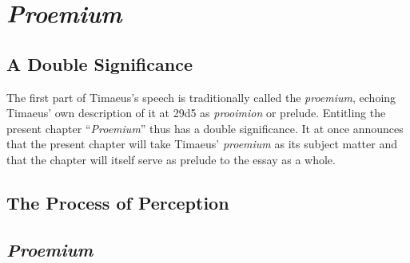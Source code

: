 
\chapter{\emph{Proemium}} %
\label{cha:proemium}

\section{A Double Significance} %
\label{sec:a_double_significance}

The first part of Timaeus's speech is traditionally called the \emph{proemium}, echoing Timaeus' own description of it at 29d5 as \emph{prooimion} or prelude. Entitling the present chapter ``\emph{Proemium}'' thus has a double significance. It at once announces that the present chapter will take Timaeus' \emph{proemium} as its subject matter and that the chapter will itself serve as prelude to the essay as a whole.


\section{The Process of Perception} %
\label{sec:the_process_of_perception}




\section{\emph{Proemium}} %
\label{sec:proemium}




